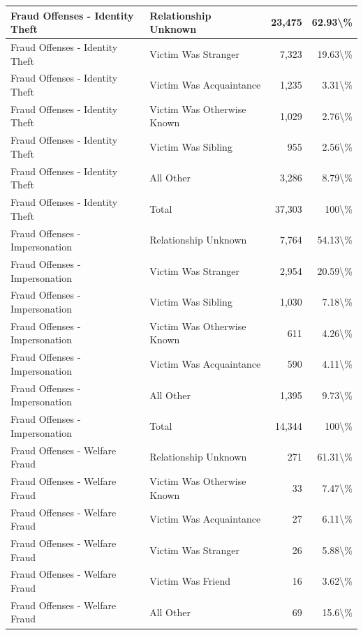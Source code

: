 \documentclass[
]{krantz}
\begin{document}
\begin{longtable}[t]{l|l|r|r}
\hline
Fraud Offenses - Identity Theft & Relationship Unknown & 23,475 & 62.93\textbackslash{}\%\\
\hline
Fraud Offenses - Identity Theft & Victim Was Stranger & 7,323 & 19.63\textbackslash{}\%\\
\hline
Fraud Offenses - Identity Theft & Victim Was Acquaintance & 1,235 & 3.31\textbackslash{}\%\\
\hline
Fraud Offenses - Identity Theft & Victim Was Otherwise Known & 1,029 & 2.76\textbackslash{}\%\\
\hline
Fraud Offenses - Identity Theft & Victim Was Sibling & 955 & 2.56\textbackslash{}\%\\
\hline
Fraud Offenses - Identity Theft & All Other & 3,286 & 8.79\textbackslash{}\%\\
\hline
Fraud Offenses - Identity Theft & Total & 37,303 & 100\textbackslash{}\%\\
\hline
Fraud Offenses - Impersonation & Relationship Unknown & 7,764 & 54.13\textbackslash{}\%\\
\hline
Fraud Offenses - Impersonation & Victim Was Stranger & 2,954 & 20.59\textbackslash{}\%\\
\hline
Fraud Offenses - Impersonation & Victim Was Sibling & 1,030 & 7.18\textbackslash{}\%\\
\hline
Fraud Offenses - Impersonation & Victim Was Otherwise Known & 611 & 4.26\textbackslash{}\%\\
\hline
Fraud Offenses - Impersonation & Victim Was Acquaintance & 590 & 4.11\textbackslash{}\%\\
\hline
Fraud Offenses - Impersonation & All Other & 1,395 & 9.73\textbackslash{}\%\\
\hline
Fraud Offenses - Impersonation & Total & 14,344 & 100\textbackslash{}\%\\
\hline
Fraud Offenses - Welfare Fraud & Relationship Unknown & 271 & 61.31\textbackslash{}\%\\
\hline
Fraud Offenses - Welfare Fraud & Victim Was Otherwise Known & 33 & 7.47\textbackslash{}\%\\
\hline
Fraud Offenses - Welfare Fraud & Victim Was Acquaintance & 27 & 6.11\textbackslash{}\%\\
\hline
Fraud Offenses - Welfare Fraud & Victim Was Stranger & 26 & 5.88\textbackslash{}\%\\
\hline
Fraud Offenses - Welfare Fraud & Victim Was Friend & 16 & 3.62\textbackslash{}\%\\
\hline
Fraud Offenses - Welfare Fraud & All Other & 69 & 15.6\textbackslash{}\%\\

\end{longtable}
\end{document}
